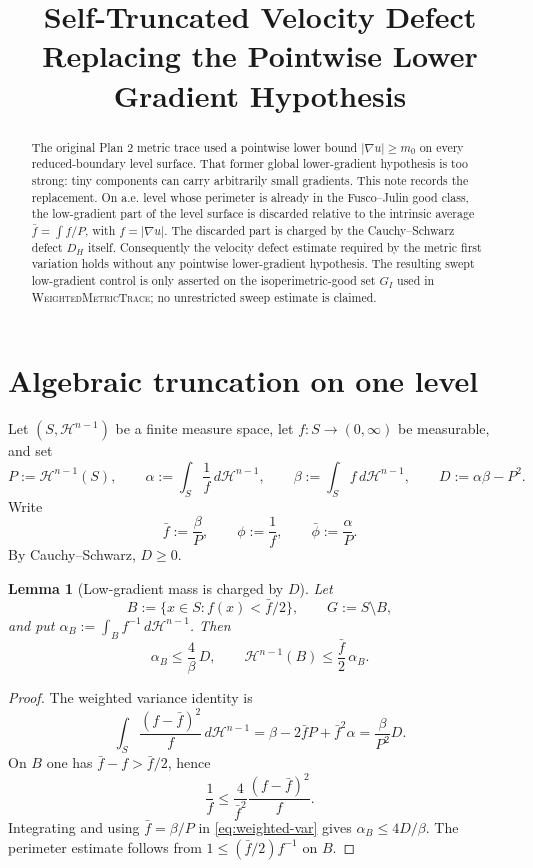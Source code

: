 \documentclass[11pt]{article}
\title{Self-Truncated Velocity Defect\\
       Replacing the Pointwise Lower Gradient Hypothesis}
\author{}
\date{}
\newtheorem{lemma}[theorem]{Lemma}
\theoremstyle{definition}
\newcommand{\Hn}{\mathcal H^{n-1}}
\begin{document}
\maketitle

\begin{abstract}
The original Plan 2 metric trace used a pointwise lower bound
$|\nabla u|\ge m_0$ on every reduced-boundary level surface.  That
former global lower-gradient hypothesis is too strong: tiny components
can carry arbitrarily small gradients.  This note records the
replacement.  On a.e. level whose perimeter is already in the
Fusco--Julin good class, the low-gradient part of the level surface is
discarded relative to the intrinsic average
$\bar f=\int f/P$, with $f=|\nabla u|$.  The discarded part is charged
by the Cauchy--Schwarz defect $D_H$ itself.  Consequently the velocity
defect estimate required by the metric first variation holds without any
pointwise lower-gradient hypothesis.  The resulting swept low-gradient
control is only asserted on the isoperimetric-good set $G_I$ used in
\textsc{WeightedMetricTrace}; no unrestricted sweep estimate is claimed.
\end{abstract}

\section{Algebraic truncation on one level}

Let $(S,\Hn)$ be a finite measure space, let $f:S\to(0,\infty)$ be
measurable, and set
\[
   P:=\Hn(S),\qquad
   \alpha:=\int_S \frac{1}{f}\,d\Hn,\qquad
   \beta:=\int_S f\,d\Hn,\qquad
   D:=\alpha\beta-P^2.
\]
Write
\[
   \bar f:=\frac{\beta}{P},\qquad
   \phi:=\frac1f,\qquad
   \bar\phi:=\frac{\alpha}{P}.
\]
By Cauchy--Schwarz, $D\ge0$.

\begin{lemma}[Low-gradient mass is charged by $D$]\label{lem:bad-alpha}
Let
\[
   B:=\{x\in S:f(x)<\bar f/2\},\qquad G:=S\setminus B,
\]
and put $\alpha_B:=\int_B f^{-1}\,d\Hn$.  Then
\begin{equation}\label{eq:alphaB}
   \alpha_B\le \frac{4}{\beta}\,D,
   \qquad
   \Hn(B)\le\frac{\bar f}{2}\,\alpha_B.
\end{equation}
\end{lemma}

\begin{proof}
The weighted variance identity is
\begin{equation}\label{eq:weighted-var}
   \int_S \frac{(f-\bar f)^2}{f}\,d\Hn
   =\beta-2\bar f P+\bar f^2\alpha
   =\frac{\beta}{P^2}D.
\end{equation}
On $B$ one has $\bar f-f>\bar f/2$, hence
\[
   \frac1f\le \frac{4}{\bar f^2}\frac{(f-\bar f)^2}{f}.
\]
Integrating and using $\bar f=\beta/P$ in \eqref{eq:weighted-var} gives
$\alpha_B\le4D/\beta$.  The perimeter estimate follows from
$1\le(\bar f/2)f^{-1}$ on $B$.
\end{proof}
\end{document}
